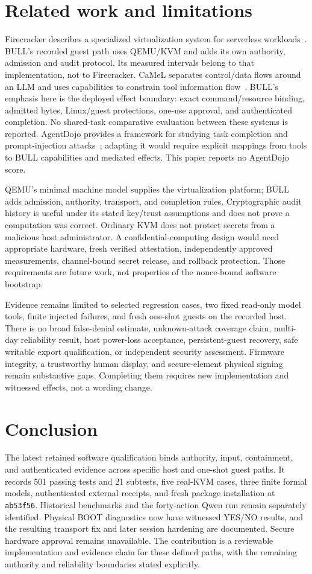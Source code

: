 \documentclass[journal]{IEEEtran}
\newcommand{\code}[1]{\texttt{#1}}
\begin{document}
\section{Related work and limitations}
Firecracker describes a specialized virtualization system for serverless workloads~\cite{E_Firecracker}. BULL's recorded guest path uses QEMU/KVM and adds its own authority, admission and audit protocol. Its measured intervals belong to that implementation, not to Firecracker.
CaMeL separates control/data flows around an LLM and uses capabilities to constrain tool information flow~\cite{camel}. BULL's emphasis here is the deployed effect boundary: exact command/resource binding, admitted bytes, Linux/guest protections, one-use approval, and authenticated completion. No shared-task comparative evaluation between these systems is reported. AgentDojo provides a framework for studying task completion and prompt-injection attacks~\cite{agentdojo}; adapting it would require explicit mappings from tools to BULL capabilities and mediated effects. This paper reports no AgentDojo score.

QEMU's minimal machine model supplies the virtualization platform; BULL adds admission, authority, transport, and completion rules. Cryptographic audit history is useful under its stated key/trust assumptions and does not prove a computation was correct. Ordinary KVM does not protect secrets from a malicious host administrator. A confidential-computing design would need appropriate hardware, fresh verified attestation, independently approved measurements, channel-bound secret release, and rollback protection. Those requirements are future work, not properties of the nonce-bound software bootstrap.

Evidence remains limited to selected regression cases, two fixed read-only model tools, finite injected failures, and fresh one-shot guests on the recorded host. There is no broad false-denial estimate, unknown-attack coverage claim, multi-day reliability result, host power-loss acceptance, persistent-guest recovery, safe writable export qualification, or independent security assessment. Firmware integrity, a trustworthy human display, and secure-element physical signing remain substantive gaps. Completing them requires new implementation and witnessed effects, not a wording change.

\section{Conclusion}
The latest retained software qualification binds authority, input, containment, and authenticated evidence across specific host and one-shot guest paths. It records 501 passing tests and 21 subtests, five real-KVM cases, three finite formal models, authenticated external receipts, and fresh package installation at \code{ab53f56}. Historical benchmarks and the forty-action Qwen run remain separately identified. Physical BOOT diagnostics now have witnessed YES/NO results, and the resulting transport fix and later session hardening are documented. Secure hardware approval remains unavailable. The contribution is a reviewable implementation and evidence chain for these defined paths, with the remaining authority and reliability boundaries stated explicitly.
\end{document}
